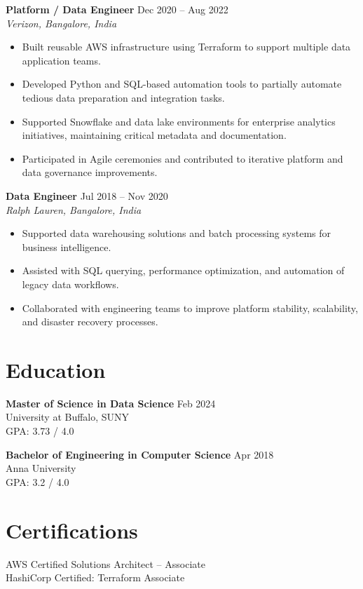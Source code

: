 \documentclass[10pt]{article}
\begin{document}
\textbf{Platform / Data Engineer} \hfill Dec 2020 -- Aug 2022 \\ %
\textit{Verizon, Bangalore, India}
\begin{itemize}[leftmargin=*, itemsep=3pt]
    \item Built reusable AWS infrastructure using Terraform to support multiple data application teams. %
    \item Developed Python and SQL-based automation tools to partially automate tedious data preparation and integration tasks. %
    \item Supported Snowflake and data lake environments for enterprise analytics initiatives, maintaining critical metadata and documentation. %
    \item Participated in Agile ceremonies and contributed to iterative platform and data governance improvements. %
\end{itemize}

\textbf{Data Engineer} \hfill Jul 2018 -- Nov 2020 \\ %
\textit{Ralph Lauren, Bangalore, India}
\begin{itemize}[leftmargin=*, itemsep=3pt]
    \item Supported data warehousing solutions and batch processing systems for business intelligence. %
    \item Assisted with SQL querying, performance optimization, and automation of legacy data workflows. %
    \item Collaborated with engineering teams to improve platform stability, scalability, and disaster recovery processes. %
\end{itemize}

\section*{Education}

\textbf{Master of Science in Data Science} \hfill Feb 2024 \\
University at Buffalo, SUNY \\
GPA: 3.73 / 4.0

\textbf{Bachelor of Engineering in Computer Science} \hfill Apr 2018 \\
Anna University \\
GPA: 3.2 / 4.0

\section*{Certifications}
AWS Certified Solutions Architect – Associate \\
HashiCorp Certified: Terraform Associate
\end{document}
